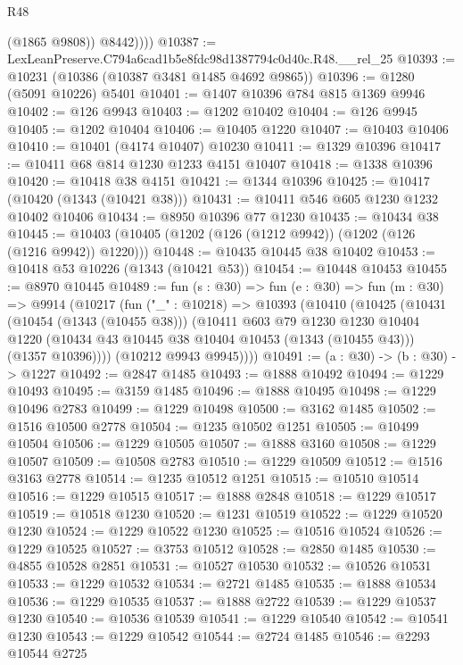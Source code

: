 \begin{lexlean}{R48}
\begin{coremodule}
              (@1865 @9808))
            @8442))))
@10387 := LexLeanPreserve.C794a6cad1b5e8fdc98d1387794c0d40c.R48.__rel_25
@10393 := @10231 (@10386 (@10387 @3481 @1485 @4692 @9865))
@10396 := @1280 (@5091 @10226) @5401
@10401 := @1407 @10396 @784 @815 @1369 @9946
@10402 := @126 @9943
@10403 := @1202 @10402
@10404 := @126 @9945
@10405 := @1202 @10404
@10406 := @10405 @1220
@10407 := @10403 @10406
@10410 := @10401 (@4174 @10407) @10230
@10411 := @1329 @10396
@10417 := @10411 @68 @814 @1230 @1233 @4151 @10407
@10418 := @1338 @10396
@10420 := @10418 @38 @4151
@10421 := @1344 @10396
@10425 := @10417 (@10420 (@1343 (@10421 @38)))
@10431 := @10411 @546 @605 @1230 @1232 @10402 @10406
@10434 := @8950 @10396 @77 @1230
@10435 := @10434 @38
@10445 := @10403 (@10405 (@1202 (@126 (@1212 @9942)) (@1202 (@126 (@1216 @9942)) @1220)))
@10448 := @10435 @10445 @38 @10402
@10453 := @10418 @53 @10226 (@1343 (@10421 @53))
@10454 := @10448 @10453
@10455 := @8970 @10445
@10489 := fun (s : @30) =>
  fun (e : @30) =>
  fun (m : @30) =>
  @9914
    (@10217
      (fun ("_" : @10218) =>
      @10393
        (@10410
          (@10425
            (@10431
              (@10454 (@1343 (@10455 @38)))
              (@10411
                @603
                @79
                @1230
                @1230
                @10404
                @1220
                (@10434 @43 @10445 @38 @10404 @10453 (@1343 (@10455 @43)))
                (@1357 @10396))))
          (@10212 @9943 @9945))))
@10491 := (a : @30) -> (b : @30) -> @1227
@10492 := @2847 @1485
@10493 := @1888 @10492
@10494 := @1229 @10493
@10495 := @3159 @1485
@10496 := @1888 @10495
@10498 := @1229 @10496 @2783
@10499 := @1229 @10498
@10500 := @3162 @1485
@10502 := @1516 @10500 @2778
@10504 := @1235 @10502 @1251
@10505 := @10499 @10504
@10506 := @1229 @10505
@10507 := @1888 @3160
@10508 := @1229 @10507
@10509 := @10508 @2783
@10510 := @1229 @10509
@10512 := @1516 @3163 @2778
@10514 := @1235 @10512 @1251
@10515 := @10510 @10514
@10516 := @1229 @10515
@10517 := @1888 @2848
@10518 := @1229 @10517
@10519 := @10518 @1230
@10520 := @1231 @10519
@10522 := @1229 @10520 @1230
@10524 := @1229 @10522 @1230
@10525 := @10516 @10524
@10526 := @1229 @10525
@10527 := @3753 @10512
@10528 := @2850 @1485
@10530 := @4855 @10528 @2851
@10531 := @10527 @10530
@10532 := @10526 @10531
@10533 := @1229 @10532
@10534 := @2721 @1485
@10535 := @1888 @10534
@10536 := @1229 @10535
@10537 := @1888 @2722
@10539 := @1229 @10537 @1230
@10540 := @10536 @10539
@10541 := @1229 @10540
@10542 := @10541 @1230
@10543 := @1229 @10542
@10544 := @2724 @1485
@10546 := @2293 @10544 @2725

\end{coremodule}
\end{lexlean}

